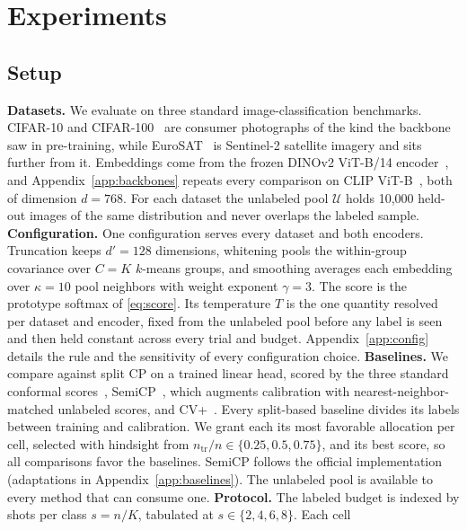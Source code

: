 \section{Experiments}
\label{sec:experiments}
\subsection{Setup}
\label{sec:setup}
\textbf{Datasets.} We evaluate on three standard image-classification
benchmarks. CIFAR-10 and CIFAR-100~\citep{krizhevsky2009learning} are
consumer photographs of the kind the backbone saw in pre-training,
while EuroSAT~\citep{helber2019eurosat} is Sentinel-2 satellite imagery
and sits further from it. Embeddings come from the frozen DINOv2
ViT-B/14 encoder~\citep{oquab2023dinov2}, and
Appendix~\ref{app:backbones} repeats every comparison on CLIP
ViT-B~\citep{radford2021clip}, both of dimension $d = 768$. For each
dataset the unlabeled pool $\mathcal{U}$ holds 10,000 held-out images
of the same distribution and never overlaps the labeled sample.
\textbf{Configuration.} One configuration serves every dataset and both
encoders. Truncation keeps $d' = 128$ dimensions, whitening pools the within-group covariance over
$C = K$ $k$-means groups, and smoothing averages each embedding over
$\kappa = 10$ pool neighbors with weight exponent $\gamma = 3$. The
score is the prototype softmax of \eqref{eq:score}. Its temperature $T$
is the one quantity resolved per dataset and encoder, fixed from the
unlabeled pool before any label is seen and then held constant across
every trial and budget. Appendix~\ref{app:config} details the rule and
the sensitivity of every configuration choice.
\textbf{Baselines.} We compare against split CP on a trained linear
head, scored by the three standard conformal
scores~\citep{sadinle2019least, romano2020aps, angelopoulos2021raps},
SemiCP~\citep{zhou2026semicp}, which augments calibration with
nearest-neighbor-matched unlabeled scores, and
CV+~\citep{barber2021predictive}.
Every split-based baseline divides its labels between training and
calibration. We grant each its most favorable allocation per cell,
selected with hindsight from $n_{\mathrm{tr}}/n \in \{0.25, 0.5,
0.75\}$, and its best score, so all comparisons favor the baselines.
SemiCP follows the official implementation (adaptations in
Appendix~\ref{app:baselines}).
The unlabeled pool is available to every method that can consume one.
\textbf{Protocol.} The labeled budget is indexed by shots per class
$s = n/K$, tabulated at $s \in \{2, 4, 6, 8\}$. Each cell
